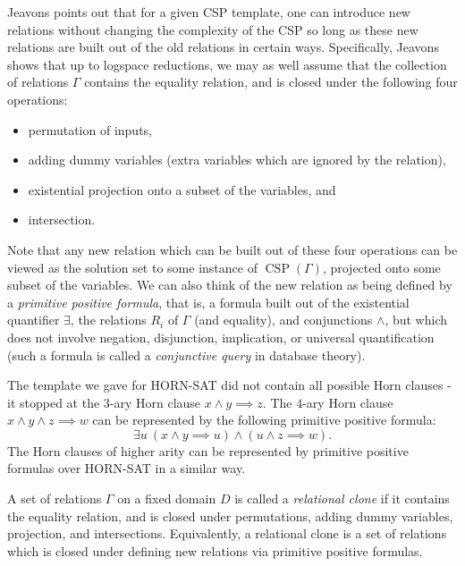 \documentclass[letterpaper,11pt]{article}
\DeclareMathOperator{\CSP}{CSP}
\begin{document}
Jeavons \cite{jeavons} points out that for a given CSP template, one can introduce new relations without changing the complexity of the CSP so long as these new relations are built out of the old relations in certain ways. Specifically, Jeavons shows that up to logspace reductions, we may as well assume that the collection of relations $\Gamma$ contains the equality relation, and is closed under the following four operations:
\begin{itemize}
\item permutation of inputs,

\item adding dummy variables (extra variables which are ignored by the relation),

\item existential projection onto a subset of the variables, and

\item intersection.
\end{itemize}
Note that any new relation which can be built out of these four operations can be viewed as the solution set to some instance of $\CSP(\Gamma)$, projected onto some subset of the variables. We can also think of the new relation as being defined by a \emph{primitive positive formula}, that is, a formula built out of the existential quantifier $\exists$, the relations $R_i$ of $\Gamma$ (and equality), and conjunctions $\wedge$, but which does not involve negation, disjunction, implication, or universal quantification (such a formula is called a \emph{conjunctive query} in database theory).

\begin{ex} The template we gave for HORN-SAT did not contain all possible Horn clauses - it stopped at the $3$-ary Horn clause $x\wedge y \implies z$. The $4$-ary Horn clause $x \wedge y \wedge z \implies w$ can be represented by the following primitive positive formula:
\[
\exists u\ (x \wedge y \implies u) \wedge (u \wedge z \implies w).
\]
The Horn clauses of higher arity can be represented by primitive positive formulas over HORN-SAT in a similar way.
\end{ex}

\begin{defn} A set of relations $\Gamma$ on a fixed domain $D$ is called a \emph{relational clone} if it contains the equality relation, and is closed under permutations, adding dummy variables, projection, and intersections. Equivalently, a relational clone is a set of relations which is closed under defining new relations via primitive positive formulas.
\end{defn}
\end{document}
